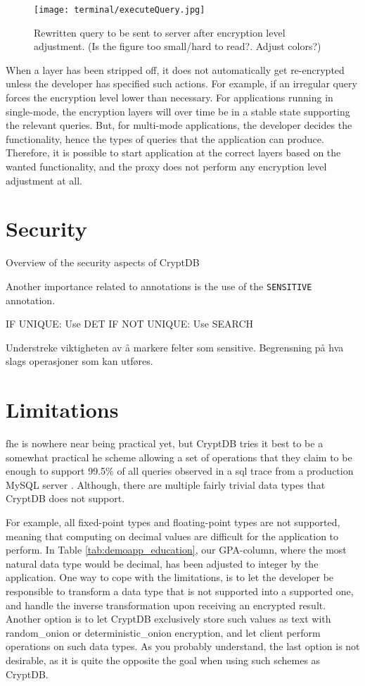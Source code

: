 \begin{figure}[h]
	\texttt{[image: terminal/executeQuery.jpg]}
	\caption{Rewritten query to be sent to server after encryption level adjustment. (Is the figure too small/hard to read?. Adjust colors?)}
	\label{rewritten_query}
\end{figure}

When a layer has been stripped off, it does not automatically get re-encrypted unless the developer has specified such actions. For example, if an irregular query forces the encryption level lower than necessary. For applications running in single-mode, the encryption layers will over time be in a stable state supporting the relevant queries. But, for multi-mode applications, the developer decides the functionality, hence the types of queries that the application can produce. Therefore, it is possible to start application at the correct layers based on the wanted functionality, and the proxy does not perform any encryption level adjustment at all.



\section{Security}

Overview of the security aspects of CryptDB

Another importance related to annotations is the use of the \verb!SENSITIVE! annotation. 

IF UNIQUE: Use DET
IF NOT UNIQUE: Use SEARCH

Understreke viktigheten av å markere felter som sensitive. Begrensning på hva slags  operasjoner som kan utføres.

\section{Limitations}

\gls{fhe} is nowhere near being practical yet, but CryptDB tries it best to be a somewhat practical \gls{he} scheme allowing a set of operations that they claim to be enough to support 99.5\% of all queries observed in a \gls{sql} trace from a production MySQL server \citep{CryptDB_Main_Paper}. Although, there are multiple fairly trivial data types that CryptDB does not support.

For example, all fixed-point types and floating-point types are not supported, meaning that computing on decimal values are difficult for the application to perform. In Table \ref{tab:demoapp_education}, our GPA-column, where the most natural data type would be decimal, has been adjusted to integer by the application. One way to cope with the limitations, is to let the developer be responsible to transform a data type that is not supported into a supported one, and handle the inverse transformation  upon receiving an encrypted result. Another option is to let CryptDB exclusively store such values as text with \gls{random_onion} or \gls{deterministic_onion} encryption, and let client perform operations on such data types. As you probably understand, the last option is not desirable, as it is quite the opposite the goal when using such schemes as CryptDB. 

